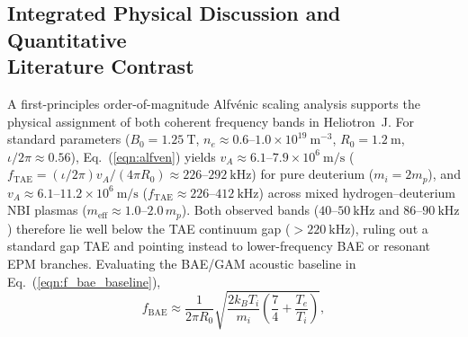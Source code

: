 \subsection[Integrated Physical Discussion and Quantitative Literature Contrast]{Integrated Physical Discussion and Quantitative\\ Literature Contrast}
\label{subsec:integrated_discussion}
A first-principles order-of-magnitude Alfv\'enic scaling analysis supports the physical assignment of both coherent frequency bands in Heliotron~J. For standard parameters ($B_0 = 1.25~\mathrm{T}$, $n_e \approx 0.6\text{--}1.0 \times 10^{19}~\mathrm{m^{-3}}$, $R_0 = 1.2~\mathrm{m}$, $\iota/2\pi \approx 0.56$), Eq.~(\ref{eqn:alfven}) yields $v_A \approx 6.1\text{--}7.9 \times 10^6~\mathrm{m/s}$ ($f_{\mathrm{TAE}} = (\iota/2\pi)v_A/(4\pi R_0) \approx 226\text{--}292~\mathrm{kHz}$) for pure deuterium ($m_i = 2 m_p$), and $v_A \approx 6.1\text{--}11.2 \times 10^6~\mathrm{m/s}$ ($f_{\mathrm{TAE}} \approx 226\text{--}412~\mathrm{kHz}$) across mixed hydrogen--deuterium NBI plasmas ($m_{\mathrm{eff}} \approx 1.0\text{--}2.0\,m_p$). Both observed bands ($40\text{--}50~\mathrm{kHz}$ and $86\text{--}90~\mathrm{kHz}$) therefore lie well below the TAE continuum gap ($> 220~\mathrm{kHz}$), ruling out a standard gap TAE and pointing instead to lower-frequency BAE or resonant EPM branches. Evaluating the BAE/GAM acoustic baseline in Eq.~(\ref{eqn:f_bae_baseline}),
\begin{equation}
\label{eqn:f_bae_baseline}
f_{\mathrm{BAE}} \approx \frac{1}{2\pi R_0}\sqrt{\frac{2 k_B T_i}{m_i}\left(\frac{7}{4} + \frac{T_e}{T_i}\right)},
\end{equation}
